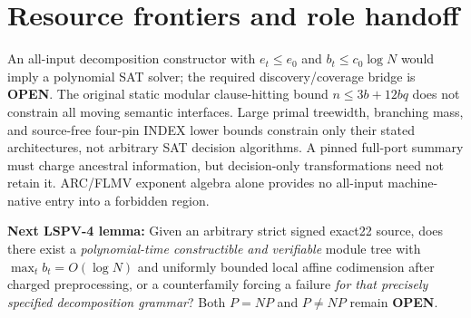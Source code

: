 \documentclass[11pt]{article}
\begin{document}
\section{Resource frontiers and role handoff}
An all-input decomposition constructor with $e_t\le e_0$ and $b_t\le c_0\log N$ would imply a polynomial SAT solver; the required discovery/coverage bridge is \textbf{OPEN}. The original static modular clause-hitting bound $n\le3b+12bq$ does not constrain all moving semantic interfaces. Large primal treewidth, branching mass, and source-free four-pin INDEX lower bounds constrain only their stated architectures, not arbitrary SAT decision algorithms. A pinned full-port summary must charge ancestral information, but decision-only transformations need not retain it. ARC/FLMV exponent algebra alone provides no all-input machine-native entry into a forbidden region.

\noindent\textbf{Next LSPV-4 lemma:} Given an arbitrary strict signed exact22 source, does there exist a \emph{polynomial-time constructible and verifiable} module tree with $\max_t b_t=O(\log N)$ and uniformly bounded local affine codimension after charged preprocessing, or a counterfamily forcing a failure \emph{for that precisely specified decomposition grammar}? Both $P=NP$ and $P\ne NP$ remain \textbf{OPEN}.


\end{document}
